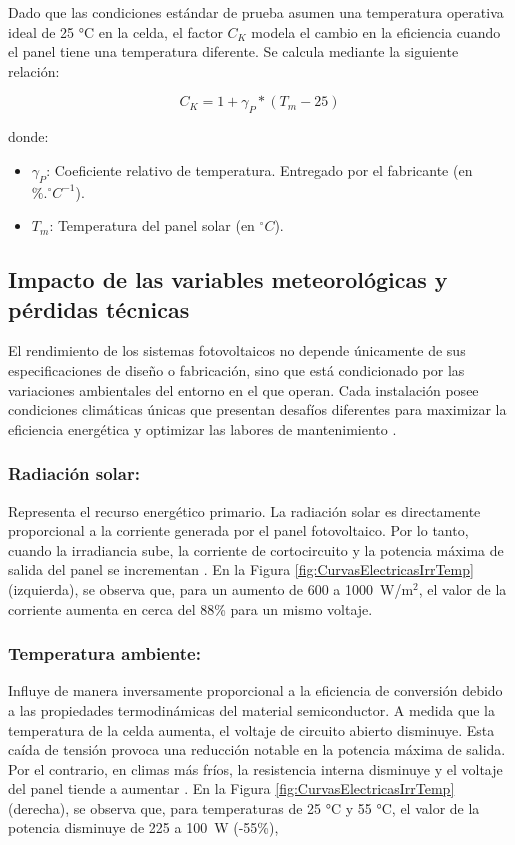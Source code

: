 \documentclass[../../General.tex]{subfiles}
\begin{document}
Dado que las condiciones estándar de prueba asumen una temperatura operativa ideal de 25 °C en la celda, el factor $C_{K}$ modela el cambio en la eficiencia cuando el panel tiene una temperatura diferente. Se calcula mediante la siguiente relación:

\begin{equation}
    C_{K} = 1 + \gamma_{P} * (T_{m} - 25)
\end{equation}

donde:
\begin{itemize}
    \item $\gamma_{P}$: Coeficiente relativo de temperatura. Entregado por el fabricante (en $\%.^{\circ}C^{-1}$).
    \item $T_{m}$: Temperatura del panel solar (en $^{\circ}C$).
\end{itemize}


\subsection{Impacto de las variables meteorológicas y pérdidas técnicas}

El rendimiento de los sistemas fotovoltaicos no depende únicamente de sus especificaciones de diseño o fabricación, sino que está condicionado por las variaciones ambientales del entorno en el que operan. Cada instalación posee condiciones climáticas únicas que presentan desafíos diferentes para maximizar la eficiencia energética y optimizar las labores de mantenimiento \citep{chicaiza2024}.


\subsubsection{\textbf{Radiación solar:}} Representa el recurso energético primario. La radiación solar es directamente proporcional a la corriente generada por el panel fotovoltaico. Por lo tanto, cuando la irradiancia sube, la corriente de cortocircuito y la potencia máxima de salida del panel se incrementan \citep{Gonzalez2019Behavioral}. En la Figura \ref{fig:CurvasElectricasIrrTemp} (izquierda), se observa que, para un aumento de 600 a 1000~W/m$^{2}$, el valor de la corriente aumenta en cerca del 88\% para un mismo voltaje.
\subsubsection{\textbf{Temperatura ambiente:}} Influye de manera inversamente proporcional a la eficiencia de conversión debido a las propiedades termodinámicas del material semiconductor. A medida que la temperatura de la celda aumenta, el voltaje de circuito abierto disminuye. Esta caída de tensión provoca una reducción notable en la potencia máxima de salida. Por el contrario, en climas más fríos, la resistencia interna disminuye y el voltaje del panel tiende a aumentar \citep{Gonzalez2019Behavioral}. En la Figura \ref{fig:CurvasElectricasIrrTemp} (derecha), se observa que, para temperaturas de 25 °C y 55 °C, el valor de la potencia disminuye de 225 a 100~W (-55\%),
\end{document}
